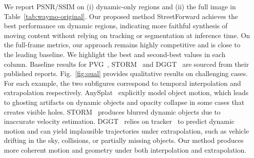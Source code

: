We report PSNR/SSIM on (i) dynamic-only regions and (ii) the full image in Table~\ref{tab:waymo-original}.
Our proposed method StreetForward achieves the best performance on dynamic regions, indicating more faithful synthesis of moving content without relying on tracking or segmentation at inference time. On the full-frame metrics, our approach remains highly competitive and is close to the leading baseline. We highlight the best and second-best values in each column. Baseline results for PVG~\cite{chen2026periodic}, STORM~\cite{yang2024storm} and DGGT~\cite{chen2025dggt} are sourced from their published reports.
Fig.~\ref{fig:qual} provides qualitative results on challenging cases. For each example, the two subfigures correspond to temporal interpolation and extrapolation respectively. AnySplat~\cite{jiang2025anysplat} explicitly model object motion, which leads to ghosting artifacts on dynamic objects and opacity collapse in some cases that creates visible holes. STORM~\cite{yang2024storm} produces blurred dynamic objects due to inaccurate velocity estimation. DGGT~\cite{chen2025dggt} relies on tracker~\cite{tapip3d} to predict dynamic motion and can yield implausible trajectories under extrapolation, such as vehicle drifting in the sky, collisions, or partially missing objects. Our method produces more coherent motion and geometry under both interpolation and extrapolation.


